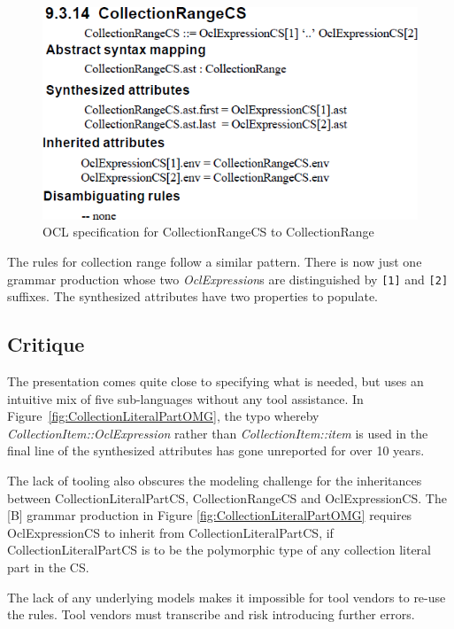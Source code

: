 \documentclass{llncs}
\begin{document}
\begin{figure}[htbp]
\centering
\includegraphics[scale=0.45]{images/CollectionRangeOMG.png}
\caption{OCL specification for CollectionRangeCS to CollectionRange}
\label{fig:CollectionRangeOMG}
\end{figure}
The rules for collection range follow a similar pattern. There is now just one grammar production whose two \emph{OclExpression}s are distinguished by \verb$[1]$ and \verb$[2]$ suffixes. The synthesized attributes have two properties to populate.

\subsection{Critique}
The presentation comes quite close to specifying what is needed, but uses an intuitive mix of five sub-languages without any tool assistance. In Figure~\ref{fig:CollectionLiteralPartOMG}, the typo whereby \emph{CollectionItem::OclExpression} rather than \emph{CollectionItem::item} is used in the final line of the synthesized attributes has gone unreported for over 10 years.

The lack of tooling also obscures the modeling challenge for the inheritances between CollectionLiteralPartCS, CollectionRangeCS and OclExpressionCS. The [B] grammar production in Figure \ref{fig:CollectionLiteralPartOMG} requires OclExpressionCS to inherit from CollectionLiteralPartCS, if CollectionLiteralPartCS is to be the polymorphic type of any collection literal part in the CS.

The lack of any underlying models makes it impossible for tool vendors to re-use the rules. Tool vendors must transcribe and risk introducing further errors.

\end{document}
